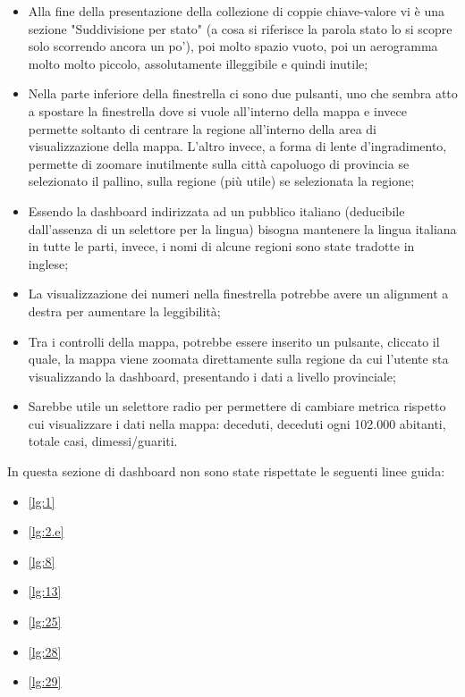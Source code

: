 \begin{itemize}
    \item Alla fine della presentazione della collezione di coppie chiave-valore vi è una sezione "Suddivisione per stato" (a cosa si riferisce la parola stato lo si scopre solo scorrendo ancora un po'), poi molto spazio vuoto, poi un aerogramma molto molto piccolo, assolutamente illeggibile e quindi inutile;
    \item Nella parte inferiore della finestrella ci sono due pulsanti, uno che sembra atto a spostare la finestrella dove si vuole all'interno della mappa e invece permette soltanto di centrare la regione all'interno della area di visualizzazione della mappa. L'altro invece, a forma di lente d'ingradimento, permette di zoomare inutilmente sulla città capoluogo di provincia se selezionato il pallino, sulla regione (più utile) se selezionata la regione;
    \item Essendo la dashboard indirizzata ad un pubblico italiano (deducibile dall'assenza di un selettore per la lingua) bisogna mantenere la lingua italiana in tutte le parti, invece, i nomi di alcune regioni sono state tradotte in inglese;
    \item La visualizzazione dei numeri nella finestrella potrebbe avere un alignment a destra per aumentare la leggibilità;
    \item Tra i controlli della mappa, potrebbe essere inserito un pulsante, cliccato il quale, la mappa viene zoomata direttamente sulla regione da cui l'utente sta visualizzando la dashboard, presentando i dati a livello provinciale;
    \item Sarebbe utile un selettore radio per permettere di cambiare metrica rispetto cui visualizzare i dati nella mappa: deceduti, deceduti ogni 102.000 abitanti, totale casi, dimessi/guariti.
\end{itemize}
In questa sezione di dashboard non sono state rispettate le seguenti linee guida:
\begin{itemize}
    \item \ref{lg:1}
    \item \ref{lg:2.e}
    \item \ref{lg:8}
    \item \ref{lg:13}
    \item \ref{lg:25}
    \item \ref{lg:28}
    \item \ref{lg:29}
\end{itemize}

